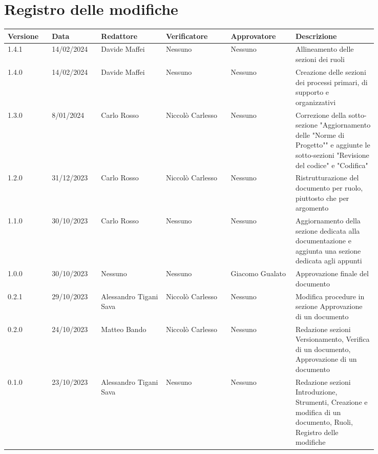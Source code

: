 \section*{Registro delle modifiche}
 {
  \scriptsize
  \begin{tabular}{p{0.10\linewidth}p{0.10\linewidth}p{0.15\linewidth}p{0.15\linewidth}p{0.15\linewidth}p{0.19\linewidth}}
	  \textbf{Versione} & \textbf{Data} & \textbf{Redattore}     & \textbf{Verificatore} & \textbf{Approvatore} & \textbf{Descrizione}                                                                                             \\
	  \hline
	  1.4.1             & 14/02/2024    & Davide Maffei          & Nessuno               & Nessuno              & Allineamento delle sezioni dei ruoli                                                                             \\
	  \hline
	  1.4.0             & 14/02/2024    & Davide Maffei          & Nessuno               & Nessuno              & Creazione delle sezioni dei processi primari, di supporto e organizzativi                                        \\
	  \hline
	  1.3.0             & 8/01/2024     & Carlo Rosso            & Niccolò Carlesso      & Nessuno              & Correzione della sotto-sezione "Aggiornamento
	  delle "Norme di Progetto"" e aggiunte le sotto-sezioni "Revisione del codice" e "Codifica"                                                                                                                                   \\
	  \hline
	  1.2.0             & 31/12/2023    & Carlo Rosso            & Niccolò Carlesso      & Nessuno              & Ristrutturazione del documento per ruolo, piuttosto che per argomento                                            \\
	  \hline
	  1.1.0             & 30/10/2023    & Carlo Rosso            & Nessuno               & Nessuno              & Aggiornamento della sezione dedicata alla documentazione e aggiunta una sezione dedicata agli appunti            \\
	  \hline
	  1.0.0             & 30/10/2023    & Nessuno                & Nessuno               & Giacomo Gualato      & Approvazione finale del documento                                                                                \\
	  \hline
	  0.2.1             & 29/10/2023    & Alessandro Tigani Sava & Niccolò Carlesso      & Nessuno              & Modifica procedure in sezione Approvazione di un documento                                                       \\
	  \hline
	  0.2.0             & 24/10/2023    & Matteo Bando           & Niccolò Carlesso      & Nessuno              & Redazione sezioni Versionamento, Verifica di un documento, Approvazione di un documento                          \\
	  \hline
	  0.1.0             & 23/10/2023    & Alessandro Tigani Sava & Nessuno               & Nessuno              & Redazione sezioni Introduzione, Strumenti, Creazione e modifica di un documento, Ruoli, Registro delle modifiche \\
	  \hline
  \end{tabular}
 }
